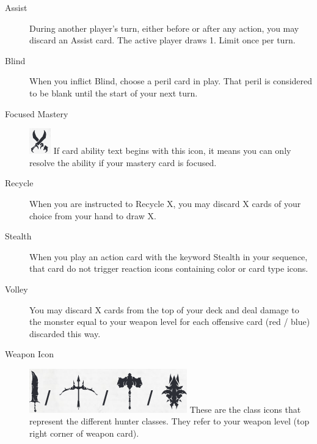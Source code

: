 \documentclass[12pt]{article}
\begin{document}
\begin{mdframed}[style=SummaryCard, align=center, userdefinedwidth=35em, frametitle={Important Keywords (Mirah)}]
    \begin{description}
        \item[Assist] During another player’s turn, either before or after any action, you may discard an Assist card. The active player draws 1. Limit once per turn.
        \item[Blind] When you inflict Blind, choose a peril card in play. That peril is considered to be blank until the start of your next turn.
        \item[Focused Mastery] \includegraphics[scale=0.30]{images/mastery_icon.png} If card ability text begins with this icon, it means you can only resolve the ability if your mastery card is focused.
        \item[Recycle] When you are instructed to Recycle X, you may discard X cards of your choice from your hand to draw X.
        \item[Stealth] When you play an action card with the keyword Stealth in your sequence, that card do not trigger reaction icons containing color or card type icons.
        \item[Volley] You may discard X cards from the top of your deck and deal damage to the monster equal to your weapon level for each offensive card (red / blue) discarded this way.
        \item[Weapon Icon] \includegraphics[scale=0.20]{images/weapon_level.png} These are the class icons that represent the different hunter classes. They refer to your weapon level (top right corner of weapon card).
    \end{description}
\end{mdframed}

\pagebreak
\end{document}
